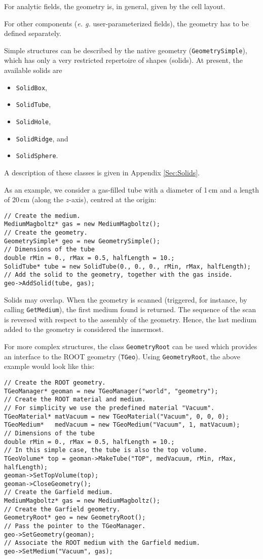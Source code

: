 For analytic fields, the geometry is, in general, given by the 
cell layout.

For other components (\textit{e. g.} user-parameterized fields), 
the geometry has to be defined separately. 

Simple structures can be described by the native geometry (\texttt{GeometrySimple}), which has only a very restricted repertoire of shapes (solids). 
At present, the available solids are
\begin{itemize}
  \item
  \texttt{SolidBox}, 
  \item
  \texttt{SolidTube}, 
  \item
  \texttt{SolidHole}, 
  \item
  \texttt{SolidRidge}, and
  \item
  \texttt{SolidSphere}.
\end{itemize} 
A description of these classes is given in Appendix \ref{Sec:Solids}.

As an example, we consider a gas-filled tube with a diameter of 1\,cm and 
a length of 20\,cm (along the \(z\)-axis), centred at the origin:
\begin{lstlisting}
// Create the medium.
MediumMagboltz* gas = new MediumMagboltz();
// Create the geometry.
GeometrySimple* geo = new GeometrySimple();
// Dimensions of the tube
double rMin = 0., rMax = 0.5, halfLength = 10.;
SolidTube* tube = new SolidTube(0., 0., 0., rMin, rMax, halfLength);
// Add the solid to the geometry, together with the gas inside.
geo->AddSolid(tube, gas);
\end{lstlisting}

Solids may overlap. 
When the geometry is scanned 
(triggered, for instance, by calling \texttt{GetMedium}), the  
first medium found is returned. 
The sequence of the scan is reversed with respect to the 
assembly of the geometry. 
Hence, the last medium added to the geometry is considered the innermost. 

For more complex structures, the class \texttt{GeometryRoot} can be used 
which provides an interface to the ROOT geometry (\texttt{TGeo}).
Using \texttt{GeometryRoot}, the above example would look like this:
\begin{lstlisting}
// Create the ROOT geometry.
TGeoManager* geoman = new TGeoManager("world", "geometry");
// Create the ROOT material and medium. 
// For simplicity we use the predefined material "Vacuum".
TGeoMaterial* matVacuum = new TGeoMaterial("Vacuum", 0, 0, 0);
TGeoMedium*   medVacuum = new TGeoMedium("Vacuum", 1, matVacuum);
// Dimensions of the tube
double rMin = 0., rMax = 0.5, halfLength = 10.;
// In this simple case, the tube is also the top volume.
TGeoVolume* top = geoman->MakeTube("TOP", medVacuum, rMin, rMax, halfLength);
geoman->SetTopVolume(top);
geoman->CloseGeometry();
// Create the Garfield medium.
MediumMagboltz* gas = new MediumMagboltz();
// Create the Garfield geometry.
GeometryRoot* geo = new GeometryRoot();
// Pass the pointer to the TGeoManager.
geo->SetGeometry(geoman);
// Associate the ROOT medium with the Garfield medium.
geo->SetMedium("Vacuum", gas); 
\end{lstlisting} 

